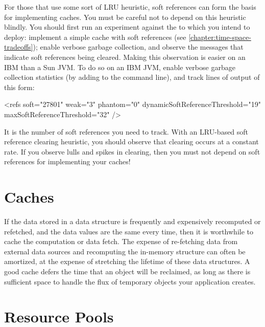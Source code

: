 For those \jres that use some sort of LRU heuristic, soft references can form the
basis for implementing caches. You must be careful not to depend on this
heuristic blindly. You should first run an experiment against the \jre to which
you intend to deploy: implement a simple cache with soft references (see
\autoref{chapter:time-space-tradeoffs}); enable verbose garbage collection, and
observe the messages that indicate soft references being cleared. Making this
observation is easier on an IBM than a Sun JVM. To do so on an IBM JVM, enable
verbose garbage collection statistics (by adding  to the
command line), and track lines of output of this form:
\begin{shortlisting}
<refs soft="27801" weak="3" phantom="0" dynamicSoftReferenceThreshold="19" maxSoftReferenceThreshold="32" />
\end{shortlisting}
It is the number of soft references you need to track. With an
LRU-based soft reference clearing heuristic, you should observe that clearing
occurs at a constant rate. If you observe lulls and spikes in clearing, then you
must not depend on soft references for implementing your caches!




\section{Caches}

If the data stored in a data structure is frequently and expensively recomputed
or refetched, and the data values are the same every time, then it is worthwhile
to cache the computation or data fetch. The expense of re-fetching data from
external data sources and recomputing the in-memory structure can often be
amortized, at the expense of stretching the lifetime of these data structures. A
good cache defers the time that an object will be reclaimed, as long as there is
sufficient space to handle the flux of temporary objects your application
creates.


\section{Resource Pools}
\label{sec:resource-pools}

